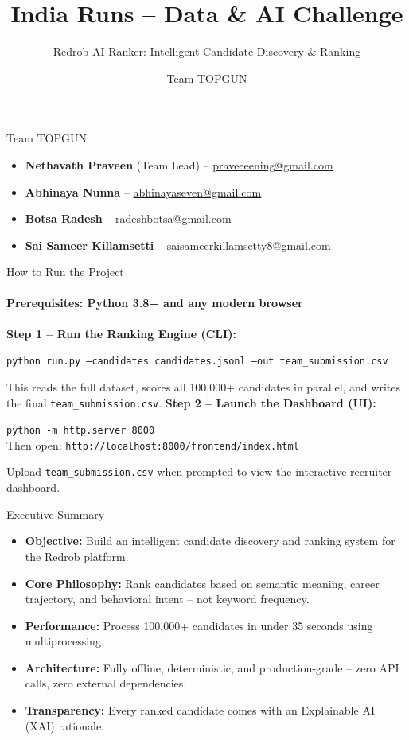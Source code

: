 \documentclass[aspectratio=169]{beamer}
\title{India Runs -- Data \& AI Challenge}
\subtitle{Redrob AI Ranker: Intelligent Candidate Discovery \& Ranking}
\author{Team TOPGUN}
\date{}
\begin{document}
\begin{frame}
  \titlepage
\end{frame}

\begin{frame}{Team TOPGUN}
  \begin{itemize}
    \item \textbf{Nethavath Praveen} (Team Lead) -- \href{mailto:praveeeening@gmail.com}{praveeeening@gmail.com}
    \item \textbf{Abhinaya Nunna} -- \href{mailto:abhinayaseven@gmail.com}{abhinayaseven@gmail.com}
    \item \textbf{Botsa Radesh} -- \href{mailto:radeshbotsa@gmail.com}{radeshbotsa@gmail.com}
    \item \textbf{Sai Sameer Killamsetti} -- \href{mailto:saisameerkillamsetty8@gmail.com}{saisameerkillamsetty8@gmail.com}
  \end{itemize}
\end{frame}

\begin{frame}{How to Run the Project}
  \framesubtitle{Prerequisites: Python 3.8+ and any modern browser}
  \textbf{Step 1 -- Run the Ranking Engine (CLI):}
  \begin{block}{}
    \texttt{python run.py --candidates candidates.jsonl --out team\_submission.csv}
  \end{block}
  \vspace{0.5em}
  This reads the full dataset, scores all 100,000+ candidates in parallel, and writes the final \texttt{team\_submission.csv}.
  \vspace{1em}
  \textbf{Step 2 -- Launch the Dashboard (UI):}
  \begin{block}{}
    \texttt{python -m http.server 8000}\\
    Then open: \texttt{http://localhost:8000/frontend/index.html}
  \end{block}
  \vspace{0.5em}
  Upload \texttt{team\_submission.csv} when prompted to view the interactive recruiter dashboard.
\end{frame}

\begin{frame}{Executive Summary}
  \begin{itemize}
    \item \textbf{Objective:} Build an intelligent candidate discovery and ranking system for the Redrob platform.
    \item \textbf{Core Philosophy:} Rank candidates based on semantic meaning, career trajectory, and behavioral intent -- not keyword frequency.
    \item \textbf{Performance:} Process 100,000+ candidates in under 35 seconds using multiprocessing.
    \item \textbf{Architecture:} Fully offline, deterministic, and production-grade -- zero API calls, zero external dependencies.
    \item \textbf{Transparency:} Every ranked candidate comes with an Explainable AI (XAI) rationale.
  \end{itemize}
\end{frame}
\end{document}
